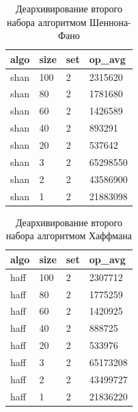 \documentclass[a4paper,12pt]{article} %
\begin{document}
    \begin{table}[!htb]
        \centering
        \caption{Деархивирование второго набора алгоритмом Шеннона-Фано}
        \begin{tabular}{|l|l|l|l|}
            \hline
            algo & size & set & op\_avg \\ \hline
            shan & 100 & 2 & 2315620 \\ \hline
            shan & 80 & 2 & 1781680 \\ \hline
            shan & 60 & 2 & 1426589 \\ \hline
            shan & 40 & 2 & 893291 \\ \hline
            shan & 20 & 2 & 537642 \\ \hline
            shan & 3 & 2 & 65298550 \\ \hline
            shan & 2 & 2 & 43586900 \\ \hline
            shan & 1 & 2 & 21883098 \\ \hline
        \end{tabular}
    \end{table}
    \begin{table}[!htb]
       \centering
       \caption{Деархивирование второго набора алгоритмом Хаффмана}
        \begin{tabular}{|l|l|l|l|}
            \hline
            algo & size & set & op\_avg \\ \hline
            haff & 100 & 2 & 2307712 \\ \hline
            haff & 80 & 2 & 1775259 \\ \hline
            haff & 60 & 2 & 1420925 \\ \hline
            haff & 40 & 2 & 888725 \\ \hline
            haff & 20 & 2 & 533976 \\ \hline
            haff & 3 & 2 & 65173208 \\ \hline
            haff & 2 & 2 & 43499727 \\ \hline
            haff & 1 & 2 & 21836220 \\ \hline
        \end{tabular}
    \end{table}
\end{document}
